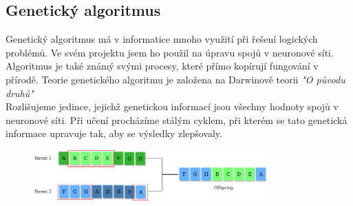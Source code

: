 \documentclass[a4paper,12pt]{article}
\newcommand{\tab}
{
    \hspace*{1em}
}
\begin{document}
    \subsection{Genetický algoritmus}
        Genetický algoritmus má v informatice mnoho využití při řešení logických problémů. 
        Ve svém projektu jsem ho použil na úpravu spojů v neuronové síti. Algoritmus je také známý svými 
        procesy, které přímo kopírují fungování v přírodě. Teorie genetického algoritmu je založena 
        na Darwinově teorii \textit{"O původu druhů"}\\
        \tab Rozlišujeme jedince, jejichž genetickou informací jsou všechny hodnoty spojů v neuronové síti. 
        Při učení procházíme stálým cyklem, při kterém se tato genetická informace upravuje tak, 
        aby se výsledky zlepšovaly.
        \vspace{0.5cm}
        \begin{figure}[H]
            \centering
            \includegraphics[width=0.8\textwidth]{data/genetic-algorithm.png}
            \label{fig:crossover}
        \end{figure}
\end{document}
